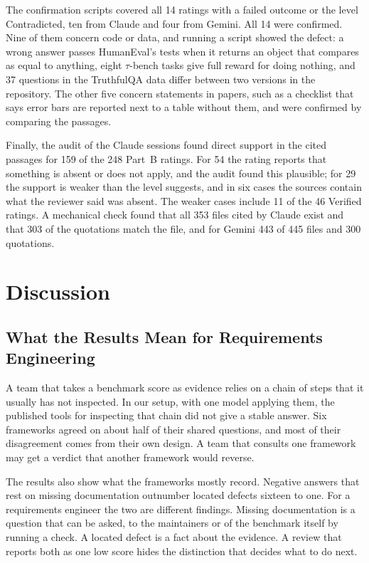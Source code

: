 \documentclass[runningheads]{llncs}
\begin{document}
The confirmation scripts covered all 14 ratings with a failed outcome or the level Contradicted, ten from Claude and four from Gemini. All 14 were confirmed. Nine of them concern code or data, and running a script showed the defect: a wrong answer passes HumanEval's tests when it returns an object that compares as equal to anything, eight $\tau$-bench tasks give full reward for doing nothing, and 37 questions in the TruthfulQA data differ between two versions in the repository. The other five concern statements in papers, such as a checklist that says error bars are reported next to a table without them, and were confirmed by comparing the passages.

Finally, the audit of the Claude sessions found direct support in the cited passages for 159 of the 248 Part~B ratings. For 54 the rating reports that something is absent or does not apply, and the audit found this plausible; for 29 the support is weaker than the level suggests, and in six cases the sources contain what the reviewer said was absent. The weaker cases include 11 of the 46 Verified ratings. A mechanical check found that all 353 files cited by Claude exist and that 303 of the quotations match the file, and for Gemini 443 of 445 files and 300 quotations.

\section{Discussion}
\label{sec:discussion}

\subsection{What the Results Mean for Requirements Engineering}
A team that takes a benchmark score as evidence relies on a chain of steps that it usually has not inspected. In our setup, with one model applying them, the published tools for inspecting that chain did not give a stable answer. Six frameworks agreed on about half of their shared questions, and most of their disagreement comes from their own design. A team that consults one framework may get a verdict that another framework would reverse.

The results also show what the frameworks mostly record. Negative answers that rest on missing documentation outnumber located defects sixteen to one. For a requirements engineer the two are different findings. Missing documentation is a question that can be asked, to the maintainers or of the benchmark itself by running a check. A located defect is a fact about the evidence. A review that reports both as one low score hides the distinction that decides what to do next.
\end{document}
